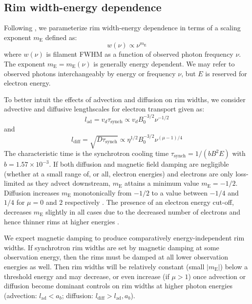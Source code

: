\documentclass[iop, apj, numberedappendix]{emulateapj}
\newcommand*{\mt}{\mathrm}
\newcommand*{\tsynch}{\tau_{\mt{synch}}}
\newcommand*{\mE}{m_\mt{E}}
\begin{document}
\subsection{Rim width-energy dependence} \label{sec:energydep}

Following , we parameterize rim width-energy dependence
in terms of a scaling exponent $\mE$ defined as:
\begin{equation}
    w(\nu) \propto \nu^{\mE}
\end{equation}
where $w(\nu)$ is filament FWHM as a function of observed photon frequency
$\nu$.  The exponent $\mE = \mE(\nu)$ is generally energy dependent.  We may
refer to observed photons interchangeably by energy or frequency $\nu$, but $E$
is reserved for electron energy.

To better intuit the effects of advection and diffusion on rim widths, we
consider advective and diffusive lengthscales for electron transport given as:
\begin{equation} \label{eq:lad}
    l_{\mt{ad}} = v_d \tsynch \propto v_d B_0^{-3/2} \nu^{-1/2}
\end{equation}
and
\begin{equation} \label{eq:ldiff}
    l_{\mt{diff}} = \sqrt{D \tsynch} \propto \eta^{1/2} B_0^{-3/2} \nu^{(\mu-1)/4}
\end{equation}
The characteristic time is the synchrotron cooling time
$\tsynch = 1 / (b B^2 E)$ with $b = 1.57 \times 10^{-3}$.
If both diffusion and magnetic field damping are negligible (whether at a small
range of, or all, electron energies) and electrons are only loss-limited as
they advect downstream, $\mE$ attains a minimum value $\mE = -1/2$.  Diffusion
increases $\mE$ monotonically from $-1/2$ to a value between $-1/4$ and $1/4$
for $\mu = 0$ and $2$ respectively .  The
presence of an electron energy cut-off, decreases $\mE$ slightly in all cases
due to the decreased number of electrons and hence thinner rims at higher
energies .

We expect magnetic damping to produce comparatively energy-independent rim
widths.  If synchrotron rim widths are set by magnetic damping
at some observation energy, then the rims must be damped at all lower
observation energies as well.  Then rim widths will be relatively constant
(small $|\mE|$) below a threshold energy and may decrease, or even increase
(if $\mu > 1$) once advection or diffusion become dominant controls on rim
widths at higher photon energies (advection: $l_\mt{ad} < a_b$;
diffusion: $l_{\mt{diff}} > l_{\mt{ad}}, a_b$).
\end{document}
